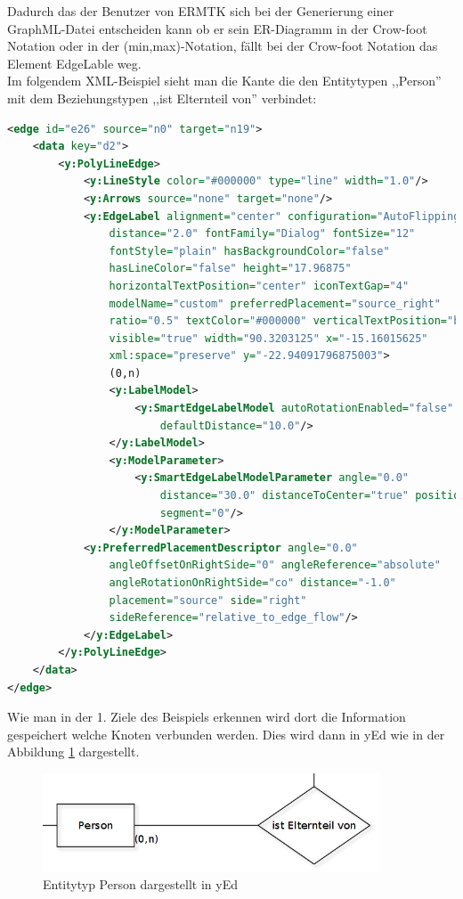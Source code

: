 \noindent
Dadurch das der Benutzer von ERMTK sich bei der Generierung einer GraphML-Datei entscheiden kann ob er sein ER-Diagramm in der Crow-foot Notation oder in der (min,max)-Notation, fällt bei der Crow-foot Notation das Element EdgeLable weg.
\\

\noindent
Im folgendem XML-Beispiel sieht man die Kante die den Entitytypen ,,Person'' mit dem Beziehungstypen ,,ist Elternteil von'' verbindet:

\begin{lstlisting}[language=XML, caption=Kante zwischen einem Entitytypen und einem Beziehungstypen, label={xmlKanten}]
<edge id="e26" source="n0" target="n19">
	<data key="d2">
		<y:PolyLineEdge>
			<y:LineStyle color="#000000" type="line" width="1.0"/>
			<y:Arrows source="none" target="none"/>
			<y:EdgeLabel alignment="center" configuration="AutoFlippingLabel"
				distance="2.0" fontFamily="Dialog" fontSize="12"
				fontStyle="plain" hasBackgroundColor="false"
				hasLineColor="false" height="17.96875"
				horizontalTextPosition="center" iconTextGap="4"
				modelName="custom" preferredPlacement="source_right"
				ratio="0.5" textColor="#000000" verticalTextPosition="bottom"
				visible="true" width="90.3203125" x="-15.16015625"
				xml:space="preserve" y="-22.94091796875003">
				(0,n)
				<y:LabelModel>
					<y:SmartEdgeLabelModel autoRotationEnabled="false" defaultAngle="0.0"
						defaultDistance="10.0"/>
				</y:LabelModel>
				<y:ModelParameter>
					<y:SmartEdgeLabelModelParameter angle="0.0"
						distance="30.0" distanceToCenter="true" position="right" ratio="0.0" 
						segment="0"/>
				</y:ModelParameter>
			<y:PreferredPlacementDescriptor angle="0.0"
				angleOffsetOnRightSide="0" angleReference="absolute"
				angleRotationOnRightSide="co" distance="-1.0"
				placement="source" side="right"
				sideReference="relative_to_edge_flow"/>
			</y:EdgeLabel>
		</y:PolyLineEdge>
	</data>
</edge>
\end{lstlisting}

\noindent
Wie man in der 1. Ziele des Beispiels erkennen wird dort die Information gespeichert welche Knoten verbunden werden. Dies wird dann in yEd wie in der Abbildung \ref{yedKante} dargestellt.

\begin{figure}[!h]
	\begin{center}
		\includegraphics[width=10cm]{images/yedKante.png}
		\caption{Entitytyp Person dargestellt in yEd}
		\label{yedKante}
	\end{center}
\end{figure}


